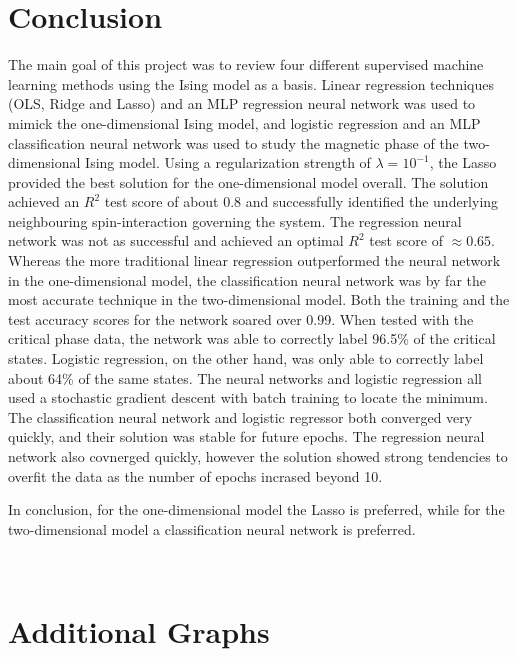 \documentclass[nofootinbib,reprint,english]{revtex4-1}
\begin{document}
\section{Conclusion}
The main goal of this project was to review four different supervised machine learning methods using the Ising model as a basis. Linear regression techniques (OLS, Ridge and Lasso) and an MLP regression neural network was used to mimick the one-dimensional Ising model, and logistic regression and an MLP classification neural network was used to study the magnetic phase of the two-dimensional Ising model. Using a regularization strength of \(\lambda=10^{-1}\), the Lasso provided the best solution for the one-dimensional model overall. The solution achieved an \(R^2\) test score of about 0.8 and successfully identified the underlying neighbouring spin-interaction governing the system. The regression neural network was not as successful and achieved an optimal \(R^2\) test score of \(\approx0.65\). Whereas the more traditional linear regression outperformed the neural network in the one-dimensional model, the classification neural network was by far the most accurate technique in the two-dimensional model. Both the training and the test accuracy scores for the network soared over 0.99. When tested with the critical phase data, the network was able to correctly label 96.5\% of the critical states. Logistic regression, on the other hand, was only able to correctly label about 64\% of the same states. The neural networks and logistic regression all used a stochastic gradient descent with batch training to locate the minimum. The classification neural network and logistic regressor both converged very quickly, and their solution was stable for future epochs. The regression neural network also covnerged quickly, however the solution showed strong tendencies to overfit the data as the number of epochs incrased beyond 10.

In conclusion, for the one-dimensional model the Lasso is preferred, while for the two-dimensional model a classification neural network is preferred.



%

~
\clearpage
\appendix

\onecolumngrid
\vspace{\columnsep}
\section{Additional Graphs}\label{app:additional_graphs}
\vspace{\columnsep}
\twocolumngrid
\end{document}
